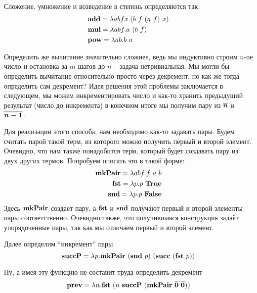 \documentclass[lambda.tex]{subfiles}
\begin{document}
Сложение, умножение и возведение в степень определяются так:
\begin{align*}
	&\text{\textbf{add}} = \lambda abfx.(b\ f\ (a\ f)\ x)\\
	&\text{\textbf{mul}} = \lambda abf.a\ (b\ f)\\
	&\text{\textbf{pow}} = \lambda ab.b\ a
\end{align*}

Определить же вычитание значительно сложнее, ведь мы индуктивно строим $n$-ое число и остановка за $m$ шагов до $n$ -- задача нетривиальная. Мы могли бы определить вычитание относительно просто через декремент, но как же тогда определить сам декремент?
Идея решения этой проблемы заключается в следующем, мы можем инкрементировать число и как-то хранить предыдущий результат (число до инкремента) в конечном итоге мы получим пару из $\boldsymbol{\overline{n}}$ и $\boldsymbol{\overline{n-1}}$.

Для реализации этого способа, нам необходимо как-то задавать пары. Будем считать парой такой терм, из которого можно получить первый и второй элемент. Очевидно, что нам также понадобится терм, который будет создавать пару из двух других термов. Попробуем описать это в такой форме:
\begin{align*}
	\text{\textbf{mkPair}} = \lambda abf.f\ a\ b\\
	\text{\textbf{fst}} = \lambda p.p\ \text{\textbf{True}}\\
	\text{\textbf{snd}} = \lambda p.p\ \text{\textbf{False}}
\end{align*}
Здесь $\text{\textbf{mkPair}}$ создает пару, а $\text{\textbf{fst}}$ и $\text{\textbf{snd}}$ получают первый и второй элементы пары соответственно. Очевидно также, что получившаяся конструкция задаёт упорядоченные пары, так как мы отличаем первый и второй элемент.

Далее определим ``инкремент'' пары
\[\mmterm{succP} = \lambda p. \mmterm{mkPair}\ (\mmterm{snd}\ p)\ (\mmterm{succ}\ (\mmterm{fst}\ p))\]

Ну, а имея эту функцию не составит труда определить декремент
\[\mmterm{prev} = \lambda n.\mmterm{fst}\ (n\ \mmterm{succP}\ (\mmterm{mkPair}\ \mmchurchn{0}\ \mmchurchn{0}))\]
\end{document}

